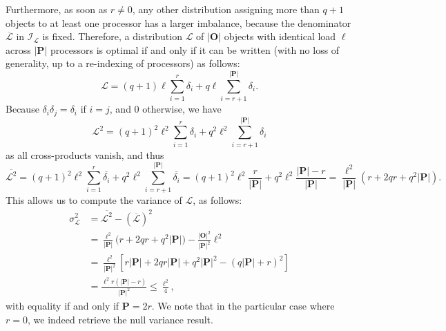 Furthermore, as soon as $r\neq0$, any other distribution assigning
more than $q+1$ objects to at least one processor has
a larger imbalance, because the denominator
$\overline{\mathcal{L}}$ in $\mathcal{I}_{\mathcal{L}}$ is fixed.
Therefore, a distribution $\mathcal{L}$ of
$\vert\mathbf{O}\vert$ objects with identical load $\ell$ across
$\vert\mathbf{P}\vert$ processors is optimal if and only if it can be
written (with no loss of generality, up to a re-indexing of
processors) as follows:
\[
\mathcal{L}=
(q+1)\ell \sum_{i=1}^{r}\delta_i
+ q\ell\!\sum_{i=r+1}^{\vert{\mathbf{P}}\vert}\delta_i.
\]
Because $\delta_i\delta_j=\delta_i$ if $i=j$, and $0$ otherwise, we have
\[
\mathcal{L}^2=
(q+1)^2\ell^2\sum_{i=1}^{r}\delta_i
+ q^2\ell^2\sum_{i=r+1}^{\vert{\mathbf{P}}\vert}\delta_i
\]
as all cross-products vanish, and thus
\[
\overline{\mathcal{L}^2}=
(q+1)^2\ell^2\sum_{i=1}^{r}\overline{\delta_i}
+ q^2\ell^2\sum_{i=r+1}^{\vert{\mathbf{P}}\vert}\overline{\delta_i}
= (q+1)^2\ell^2\frac{r}{\vert{\mathbf{P}}\vert}
+ q^2\ell^2\frac{\vert{\mathbf{P}}\vert-r}{\vert{\mathbf{P}}\vert}
= \frac{\ell^2}{\vert{\mathbf{P}}\vert}
(r + 2qr + q^2\vert{\mathbf{P}}\vert).
\]
This allows us to compute the variance of $\mathcal{L}$, as follows:
\begin{align*}
\sigma_{\mathcal{L}}^2
&= \overline{\mathcal{L}^2} - (\overline{\mathcal{L}})^2\\
&= \frac{\ell^2}{\vert{\mathbf{P}}\vert}
\big(r + 2qr + q^2\vert{\mathbf{P}}\vert\big)
- \frac{\vert\mathbf{O}\vert^2}{\vert\mathbf{P}\vert^2}\ell^2\\
&= \frac{\ell^2}{\vert{\mathbf{P}}\vert^2}
\left[r\vert{\mathbf{P}}\vert + 2qr\vert{\mathbf{P}}\vert
+ q^2\vert{\mathbf{P}}\vert^2 
- (q\vert{\mathbf{P}}\vert+r)^2\right]\\
&= \frac{\ell^2 r(\vert{\mathbf{P}}\vert - r)}
{\vert{\mathbf{P}}\vert^2}
\le \frac{\ell^2}{4},
\end{align*}
with equality if and only if $\mathbf{P}=2r$.
We note that in the particular case where $r=0$, we indeed retrieve
the null variance result.


